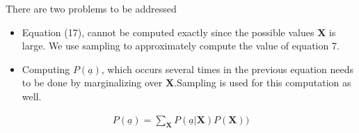 \documentclass[10pt,twocolumn,letterpaper]{article}
\begin{document}
There are two problems to be addressed
\begin{itemize}

\item{Equation (17), cannot be computed exactly since the possible values $\textbf{X}$ is large. We use sampling to approximately compute the value of equation 7.}

\item{Computing $P( \underline{a})$, which occurs several times in the previous equation needs to be done by marginalizing over $\textbf{X}$.Sampling is used for this computation as well.} 
\end{itemize}

\begin{align}
 P(\underline{a}) = \sum_{\textbf{X}}P( \underline{a}|\textbf{X})P(\textbf{X}))
\end{align}
\end{document}
